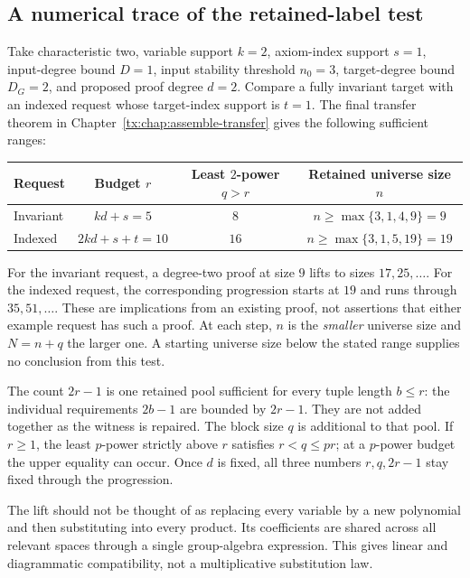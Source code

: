 \subsection{A numerical trace of the retained-label test}
Take characteristic two, variable support $k=2$, axiom-index support
$s=1$, input-degree bound $D=1$, input stability threshold $n_0=3$,
target-degree bound $D_G=2$,
and proposed proof degree $d=2$. Compare a fully invariant target with
an indexed request whose target-index support is $t=1$.
The final transfer theorem in Chapter~\ref{tx:chap:assemble-transfer}
gives the following sufficient ranges:
\begin{center}
\begin{tabular}{@{}lccc@{}}
\toprule
Request & Budget $r$ & Least $2$-power $q>r$ & Retained universe size $n$\\
\midrule
Invariant & $kd+s=5$ & $8$ & $n\ge\max\{3,1,4,9\}=9$\\
Indexed & $2kd+s+t=10$ & $16$ & $n\ge\max\{3,1,5,19\}=19$\\
\bottomrule
\end{tabular}
\end{center}
For the invariant request, a degree-two proof at size $9$ lifts to
sizes $17,25,\ldots$. For the indexed request, the corresponding
progression starts at $19$ and runs through $35,51,\ldots$.
These are implications from an existing proof, not assertions that
either example request has such a proof. At each step, $n$ is the
\emph{smaller} universe size and $N=n+q$ the larger one. A starting universe size below
the stated range supplies no conclusion from this test.

The count $2r-1$ is one retained pool sufficient for every tuple
length $b\le r$: the individual requirements $2b-1$ are bounded by
$2r-1$. They are not added together as the witness is repaired.
The block size $q$ is additional to that pool. If $r\ge1$, the least
$p$-power strictly above $r$ satisfies $r<q\le pr$; at a $p$-power
budget the upper equality can occur. Once $d$ is fixed, all three
numbers $r,q,2r-1$ stay fixed through the progression.

The lift should not be thought of as replacing every variable by a new
polynomial and then substituting into every product. Its coefficients
are shared across all relevant spaces through a single group-algebra
expression. This gives linear and diagrammatic compatibility, not a
multiplicative substitution law.


